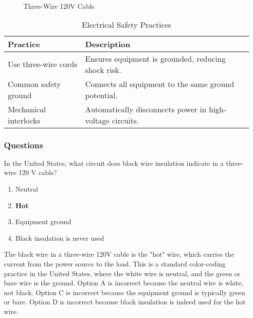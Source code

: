\begin{figure}[h]
    \centering
    \caption{Three-Wire 120V Cable}
    \label{fig:three-wire-cable}
\end{figure}

\begin{table}[h]
    \centering
    \begin{tabular}{|l|l|}
        \hline
        \textbf{Practice} & \textbf{Description} \\
        \hline
        Use three-wire cords & Ensures equipment is grounded, reducing shock risk. \\
        Common safety ground & Connects all equipment to the same ground potential. \\
        Mechanical interlocks & Automatically disconnects power in high-voltage circuits. \\
        \hline
    \end{tabular}
    \caption{Electrical Safety Practices}
    \label{tab:safety-practices}
\end{table}

\subsubsection{Questions}

\begin{tcolorbox}[colback=gray!10!white,colframe=black!75!black,title={T0A03}]
    In the United States, what circuit does black wire insulation indicate in a three-wire 120 V cable?
    \begin{enumerate}[label=\Alph*),noitemsep]
        \item Neutral
        \item \textbf{Hot}
        \item Equipment ground
        \item Black insulation is never used
    \end{enumerate}
\end{tcolorbox}

The black wire in a three-wire 120V cable is the "hot" wire, which carries the current from the power source to the load. This is a standard color-coding practice in the United States, where the white wire is neutral, and the green or bare wire is the ground. Option A is incorrect because the neutral wire is white, not black. Option C is incorrect because the equipment ground is typically green or bare. Option D is incorrect because black insulation is indeed used for the hot wire.

